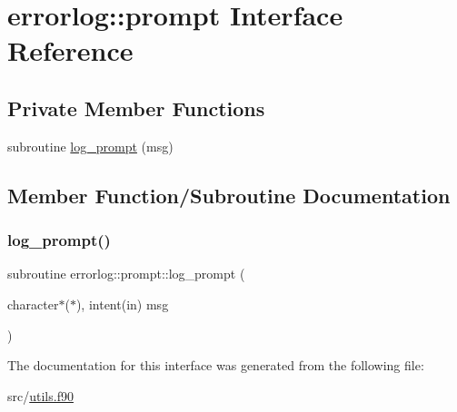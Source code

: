 \hypertarget{interfaceerrorlog_1_1prompt}{}\section{errorlog\+:\+:prompt Interface Reference}
\label{interfaceerrorlog_1_1prompt}
\subsection*{Private Member Functions}
\begin{DoxyCompactItemize}
\item 
subroutine \hyperlink{interfaceerrorlog_1_1prompt_a0ca4c6e3dab80f00c9576c913715370d}{log\+\_\+prompt} (msg)
\end{DoxyCompactItemize}


\subsection{Member Function/\+Subroutine Documentation}
\mbox{\label{interfaceerrorlog_1_1prompt_a0ca4c6e3dab80f00c9576c913715370d}} 
\subsubsection{\texorpdfstring{log\+\_\+prompt()}{log\_prompt()}}
{\footnotesize\ttfamily subroutine errorlog\+::prompt\+::log\+\_\+prompt (\begin{DoxyParamCaption}\item[{character$\ast$($\ast$), intent(in)}]{msg }\end{DoxyParamCaption})\hspace{0.3cm}{\ttfamily [private]}}



The documentation for this interface was generated from the following file\+:\begin{DoxyCompactItemize}
\item 
src/\hyperlink{utils_8f90}{utils.\+f90}\end{DoxyCompactItemize}
